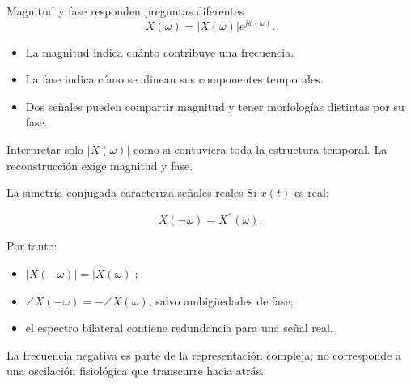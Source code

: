 \documentclass[
  ignorenonframetext,
  aspectratio=169,
  spanish,
  professionalfonts]{beamer}
\providecommand{\tightlist}{%
  \setlength{\itemsep}{0pt}\setlength{\parskip}{0pt}}
\begin{document}
\begin{frame}{Magnitud y fase responden preguntas diferentes}
\protect{}\label{magnitud-y-fase-responden-preguntas-diferentes}
\[
X(\omega)=|X(\omega)|e^{j\phi(\omega)}.
\]

\begin{itemize}
\tightlist
\item
  La magnitud indica cuánto contribuye una frecuencia.
\item
  La fase indica cómo se alinean sus componentes temporales.
\item
  Dos señales pueden compartir magnitud y tener morfologías distintas
  por su fase.
\end{itemize}

\begin{tcolorbox}[enhanced jigsaw, arc=.35mm, bottomrule=.15mm, bottomtitle=1mm, breakable, colback=white, colbacktitle=quarto-callout-warning-color!10!white, colframe=quarto-callout-warning-color-frame, coltitle=black, left=2mm, leftrule=.75mm, opacityback=0, opacitybacktitle=0.6, rightrule=.15mm, title={Error frecuente}, titlerule=0mm, toprule=.15mm, toptitle=1mm]

Interpretar solo \(|X(\omega)|\) como si contuviera toda la estructura
temporal. La reconstrucción exige magnitud y fase.

\end{tcolorbox}
\end{frame}

\begin{frame}{La simetría conjugada caracteriza señales reales}
\protect{}\label{la-simetruxeda-conjugada-caracteriza-seuxf1ales-reales}
Si \(x(t)\) es real:

\[
X(-\omega)=X^*(\omega).
\]

Por tanto:

\begin{itemize}
\tightlist
\item
  \(|X(-\omega)|=|X(\omega)|\);
\item
  \(\angle X(-\omega)=-\angle X(\omega)\), salvo ambigüedades de fase;
\item
  el espectro bilateral contiene redundancia para una señal real.
\end{itemize}

\begin{tcolorbox}[enhanced jigsaw, arc=.35mm, bottomrule=.15mm, bottomtitle=1mm, breakable, colback=white, colbacktitle=quarto-callout-note-color!10!white, colframe=quarto-callout-note-color-frame, coltitle=black, left=2mm, leftrule=.75mm, opacityback=0, opacitybacktitle=0.6, rightrule=.15mm, title={Lectura correcta}, titlerule=0mm, toprule=.15mm, toptitle=1mm]

La frecuencia negativa es parte de la representación compleja; no
corresponde a una oscilación fisiológica que transcurre hacia atrás.

\end{tcolorbox}
\end{frame}
\end{document}
